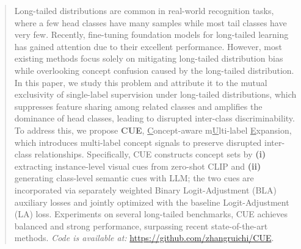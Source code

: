 \begin{abstract}
\vspace{-1em}
Long-tailed distributions are common in real-world recognition tasks, where a few head classes have many samples while most tail classes have very few. Recently, fine-tuning foundation models for long-tailed learning has gained attention due to their excellent performance. However, most existing methods focus solely on mitigating long-tailed distribution bias while overlooking concept confusion caused by the long-tailed distribution. In this paper, we study this problem and attribute it to the mutual exclusivity of single-label supervision under long-tailed distributions, which suppresses feature sharing among related classes and amplifies the dominance of head classes, leading to disrupted inter-class discriminability. To address this, we propose \textbf{CUE},  \underline{C}oncept-aware m\underline{U}lti-label \underline{E}xpansion, which introduces multi-label concept signals to preserve disrupted inter-class relationships. Specifically, CUE constructs concept sets by \textbf{(i)} extracting instance-level visual cues from zero-shot CLIP and \textbf{(ii)} generating class-level semantic cues with LLM; the two cues are incorporated via separately weighted Binary Logit-Adjustment (BLA) auxiliary losses and jointly optimized with the baseline Logit-Adjustment (LA) loss. Experiments on several long-tailed benchmarks, CUE achieves balanced and strong performance, surpassing recent state-of-the-art methods. 
\textit{Code is available at:} \url{https://github.com/zhangruichi/CUE}.




\end{abstract}